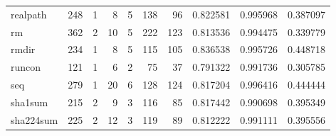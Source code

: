 \begin{longtable}{lrrrrrrrrr}
realpath  &                    248 &                                  1 &                                 8 &                                5 &                               138 &                              96 &                                0.822581 &                               0.995968 &                             0.387097 \\
rm        &                    362 &                                  2 &                                10 &                                5 &                               222 &                             123 &                                0.813536 &                               0.994475 &                             0.339779 \\
rmdir     &                    234 &                                  1 &                                 8 &                                5 &                               115 &                             105 &                                0.836538 &                               0.995726 &                             0.448718 \\
runcon    &                    121 &                                  1 &                                 6 &                                2 &                                75 &                              37 &                                0.791322 &                               0.991736 &                             0.305785 \\
seq       &                    279 &                                  1 &                                20 &                                6 &                               128 &                             124 &                                0.817204 &                               0.996416 &                             0.444444 \\
sha1sum   &                    215 &                                  2 &                                 9 &                                3 &                               116 &                              85 &                                0.817442 &                               0.990698 &                             0.395349 \\
sha224sum &                    225 &                                  2 &                                12 &                                3 &                               119 &                              89 &                                0.812222 &                               0.991111 &                             0.395556 \\

\end{longtable}

